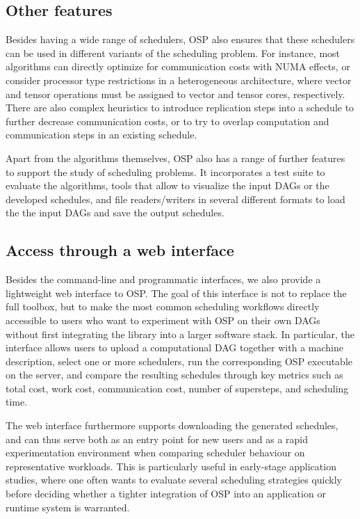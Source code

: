 \documentclass[oneside,reqno, a4paper]{amsart}
\numberwithin{equation}{section}
\begin{document}
\subsection{Other features}

Besides having a wide range of schedulers, OSP also ensures that these schedulers can be used in different variants of the scheduling problem. For instance, most algorithms can directly optimize for communication costs with NUMA effects, or consider processor type restrictions in a heterogeneous architecture, where vector and tensor operations must be assigned to vector and tensor cores, respectively. There are also complex heuristics to introduce replication steps into a schedule to further decrease communication costs, or to try to overlap computation and communication steps in an existing schedule.

Apart from the algorithms themselves, OSP also has a range of further features to support the study of scheduling problems. It incorporates a test suite to evaluate the algorithms, tools that allow to visualize the input DAGs or the developed schedules, and file readers/writers in several different formats to load the the input DAGs and save the output schedules.

\subsection{Access through a web interface}

Besides the command-line and programmatic interfaces, we also provide a lightweight web interface to OSP. The goal of this interface is not to replace the full toolbox, but to make the most common scheduling workflows directly accessible to users who want to experiment with OSP on their own DAGs without first integrating the library into a larger software stack. In particular, the interface allows users to upload a computational DAG together with a machine description, select one or more schedulers, run the corresponding OSP executable on the server, and compare the resulting schedules through key metrics such as total cost, work cost, communication cost, number of supersteps, and scheduling time.

The web interface furthermore supports downloading the generated schedules, and can thus serve both as an entry point for new users and as a rapid experimentation environment when comparing scheduler behaviour on representative workloads. This is particularly useful in early-stage application studies, where one often wants to evaluate several scheduling strategies quickly before deciding whether a tighter integration of OSP into an application or runtime system is warranted.
\end{document}
